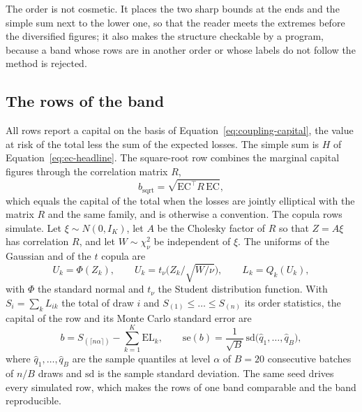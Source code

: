 

The order is not cosmetic. It places the two sharp bounds at the ends and the simple sum next to the lower one, so that the
reader meets the extremes before the diversified figures; it also makes the structure checkable by a program, because a band whose
rows are in another order or whose labels do not follow the method is rejected.

\subsection{The rows of the band}
\label{sec:method-rows}

All rows report a capital on the basis of Equation~\ref{eq:coupling-capital}, the value at risk of the total less the sum of the
expected losses. The simple sum is $H$ of Equation~\ref{eq:ec-headline}. The square-root row combines the marginal capital figures
through the correlation matrix $R$,
\begin{equation}
b_{\mathrm{sqrt}}=\sqrt{\mathrm{EC}^{\top}R\,\mathrm{EC}},
\label{eq:sqrt-row}
\end{equation}
which equals the capital of the total when the losses are jointly elliptical with the matrix $R$ and the same family, and is
otherwise a convention. The copula rows simulate. Let $\xi\sim N(0,I_K)$, let $A$ be the Cholesky factor of $R$ so that $Z=A\xi$
has correlation $R$, and let $W\sim\chi^2_\nu$ be independent of $\xi$. The uniforms of the Gaussian and of the $t$ copula are
\begin{equation}
U_k=\Phi(Z_k),\qquad U_k=t_\nu\!\Big(Z_k\big/\sqrt{W/\nu}\Big),\qquad L_k=Q_k(U_k),
\label{eq:copula-sampling}
\end{equation}
with $\Phi$ the standard normal and $t_\nu$ the Student distribution function. With $S_i=\sum_kL_{ik}$ the total of draw $i$ and $S_{(1)}\le\dots\le S_{(n)}$ its order statistics, the capital of the row and
its Monte Carlo standard error are
\begin{equation}
b=S_{(\lceil n\alpha\rceil)}-\sum_{k=1}^K\mathrm{EL}_k ,\qquad
\mathrm{se}(b)=\frac{1}{\sqrt{B}}\,\mathrm{sd}\big(\widehat q_1,\dots,\widehat q_B\big),
\label{eq:row-capital}
\end{equation}
where $\widehat q_1,\dots,\widehat q_B$ are the sample quantiles at level $\alpha$ of $B=20$ consecutive batches of $n/B$ draws and
$\mathrm{sd}$ is the sample standard deviation. The same seed drives every simulated row, which makes the rows of one band
comparable and the band reproducible.

